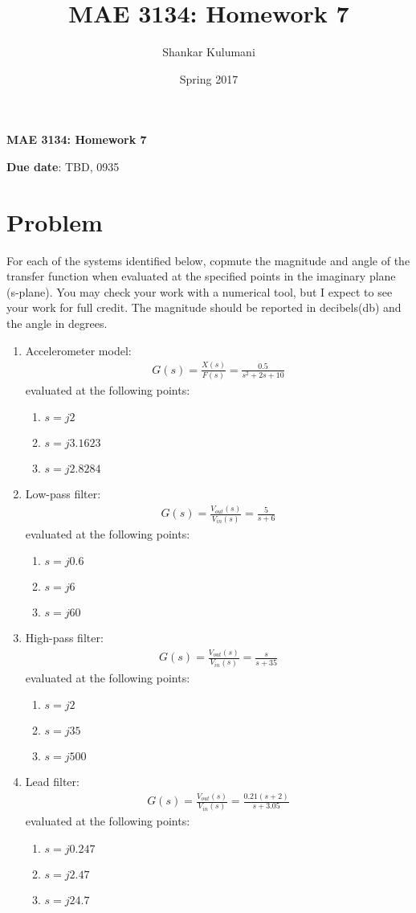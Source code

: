 \documentclass[11pt, reqno]{article}    %
\title{MAE 3134: Homework 7}
\author{Shankar Kulumani}
\date{Spring 2017}                          %
\begin{document}
{\noindent\Large \textbf{MAE 3134: Homework 7}}

\noindent \textbf{Due date}: TBD, 0935 \\
\section{Problem}
For each of the systems identified below, copmute the magnitude and angle of the transfer function when evaluated at the specified points in the imaginary plane (s-plane).
You may check your work with a numerical tool, but I expect to see your work for full credit.
The magnitude should be reported in decibels(\si{\decibel}) and the angle in degrees.
\begin{enumerate}
    \item Accelerometer model:
    \begin{align*}
        G(s) = \frac{X(s)}{F(s)} = \frac{0.5}{s^2 + 2 s + 10}
    \end{align*}
    evaluated at the following points:
    \begin{enumerate}
        \item \( s = j 2\) 
        \item \( s = j 3.1623\)
        \item \( s = j 2.8284\)
    \end{enumerate}
    \item Low-pass filter:
    \begin{align*}
        G(s) = \frac{V_{out}(s)}{V_{in}(s)} = \frac{5}{s + 6}
    \end{align*}
    evaluated at the following points:
    \begin{enumerate}
        \item \( s = j 0.6\) 
        \item \( s = j 6\)
        \item \( s = j 60\)
    \end{enumerate}
    \item High-pass filter:
    \begin{align*}
        G(s) = \frac{V_{out}(s)}{V_{in}(s)} = \frac{s}{s + 35}
    \end{align*}
    evaluated at the following points:
    \begin{enumerate}
        \item \( s = j 2\) 
        \item \( s = j 35\)
        \item \( s = j 500\)
    \end{enumerate}
    \item Lead filter:
    \begin{align*}
        G(s) = \frac{V_{out}(s)}{V_{in}(s)} = \frac{0.21(s+2)}{s + 3.05}
    \end{align*}
    evaluated at the following points:
    \begin{enumerate}
        \item \( s = j 0.247\) 
        \item \( s = j 2.47\)
        \item \( s = j 24.7\)
    \end{enumerate}
\end{enumerate}
\end{document}
